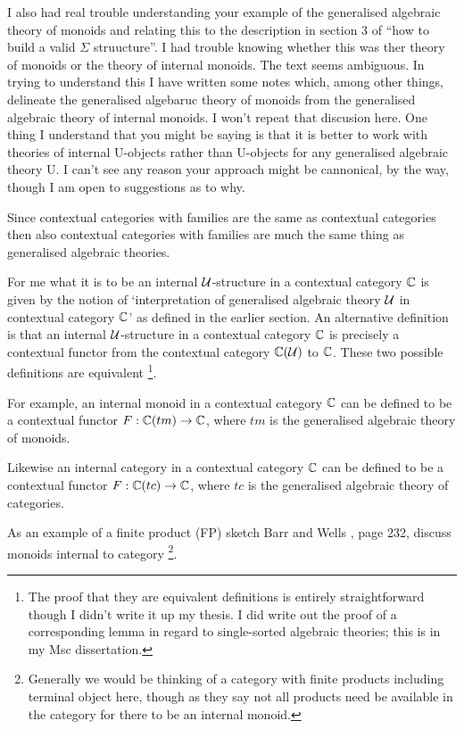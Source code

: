 \begin{notebox}
I also had real trouble understanding your example of the generalised algebraic theory of monoids and relating this to the description in section 3 of ``how to build a valid $\Sigma$ struucture''.
I had trouble knowing whether this was ther theory of monoids or the theory of internal monoids.
The text seems ambiguous. In trying to understand this I have written some notes which, among other things, delineate the generalised algebaruc theory of monoids from the generalised algebraic theory
of internal monoids. I won't repeat that discusion here. One thing I understand that you might be saying is that it is better to work with theories of internal U-objects rather than U-objects
for any generalised algebraic theory U. I can't see any reason your approach might be cannonical, by the way, though I am open to suggestions as to why.
\end{notebox}
\note
Since contextual categories with families are the same as contextual categories then also
contextual categories with families are much the same thing as generalised algebraic theories. 

\note For me what it is to be an internal $\gat[U]$-structure in a contextual category $\ccat[C]$ is given by the notion of `interpretation of  generalised algebraic theory $\gat[U]$ in  contextual category $\ccat[C]$'
as defined in the earlier section. 
An alternative definition is that an internal $\gat[U]$-structure in a contextual category $\ccat[C]$ is precisely a contextual functor from the contextual category $\CofU$ to $\ccat[C]$. These two possible definitions are equivalent
\footnote{The proof that they are equivalent definitions is entirely straightforward though I didn't write it up my thesis. I did write out the proof of a  corresponding lemma in regard to single-sorted algebraic theories; this is in my Msc dissertation.}.

\note
For example, an internal monoid in a contextual category $\ccat[C]$
can be defined to be a contextual functor $F: \ccat[C](tm) \morph  \ccat[C]$, where $tm$ is the generalised algebraic theory of monoids.


\note 
Likewise an internal category in a contextual category $\ccat[C]$
can be defined to be a contextual functor $F: \ccat[C](tc) \morph  \ccat[C]$, where $tc$ is the generalised algebraic theory of categories.



\note
As an example of a finite product (FP) sketch Barr and Wells \cite{BarrandWells}, page 232, discuss monoids internal to  category
\footnote{Generally we would be thinking of a category with finite products including terminal object here, though as they say not all products need be available in the category for there to be an internal monoid.}.

